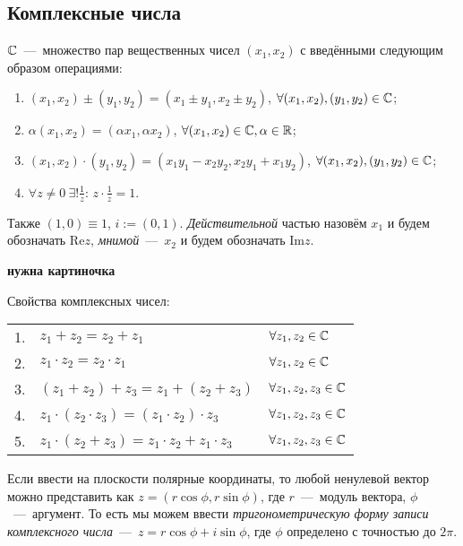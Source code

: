 \subsection{Комплексные числа}
\begin{definition}
$\mathbb{C}$~---~множество пар вещественных чисел $(x_{1}, x_{2})$ с введёнными следующим образом операциями:
\begin{enumerate}
    \item $(x_{1}, x_{2}) \pm (y_{1}, y_{2}) = (x_{1} \pm y_{1}, x_{2} \pm y_{2})$, $\forall (x_{1}, x_{2}), (y_{1}, y_{2}) \in \mathbb{C}$;
    \item $\alpha (x_{1}, x_{2}) = (\alpha x_{1}, \alpha x_{2})$, $\forall (x_{1}, x_{2}) \in \mathbb{C}, \alpha \in \mathbb{R}$;
    \item $(x_{1}, x_{2}) \cdot (y_{1}, y_{2}) = (x_{1} y_{1} - x_{2} y_{2}, x_{2} y_{1} + x_{1} y_{2})$, $\forall (x_{1}, x_{2}), (y_{1}, y_{2}) \in \mathbb{C}$;
    \item $\forall z \neq 0 \ \exists! \frac{1}{z}$: $z \cdot \frac{1}{z} = 1$.
\end{enumerate}
Также $(1, 0) \equiv 1$, $i := (0, 1)$. \textit{Действительной} частью назовём $x_{1}$ и будем обозначать $\text{Re}z$, \textit{мнимой}~---~$x_{2}$ и будем обозначать $\text{Im}z$.
\end{definition}
\begin{center}
\textbf{нужна картиночка}
\end{center}
Свойства комплексных чисел:
\begin{tabular}{cll}
1. & $z_{1} + z_{2} = z_{2} + z_{1}$ & $\forall z_{1}, z_{2} \in \mathbb{C}$ \\
2. & $z_{1} \cdot z_{2} = z_{2} \cdot z_{1}$ & $\forall z_{1}, z_{2} \in \mathbb{C}$ \\
3. & $(z_{1} + z_{2}) + z_{3} = z_{1} + (z_{2} + z_{3})$ & $\forall z_{1}, z_{2}, z_{3} \in \mathbb{C}$ \\
4. & $z_{1} \cdot (z_{2} \cdot z_{3}) = (z_{1} \cdot z_{2}) \cdot z_{3}$ & $\forall z_{1}, z_{2}, z_{3} \in \mathbb{C}$ \\
5. & $z_{1} \cdot (z_{2} + z_{3}) = z_{1} \cdot z_{2} + z_{1} \cdot z_{3}$ & $\forall z_{1}, z_{2}, z_{3} \in \mathbb{C}$ 
\end{tabular}

Если ввести на плоскости полярные координаты, то любой ненулевой вектор можно представить как $z = (r \cos{\phi}, r \sin{\phi})$, где $r$~---~модуль вектора, $\phi$~---~аргумент. То есть мы можем ввести \textit{тригонометрическую форму записи комплексного числа}~---~$z = r\cos{\phi} + i \sin{\phi}$, где $\phi$ определено с точностью до $2\pi$.

